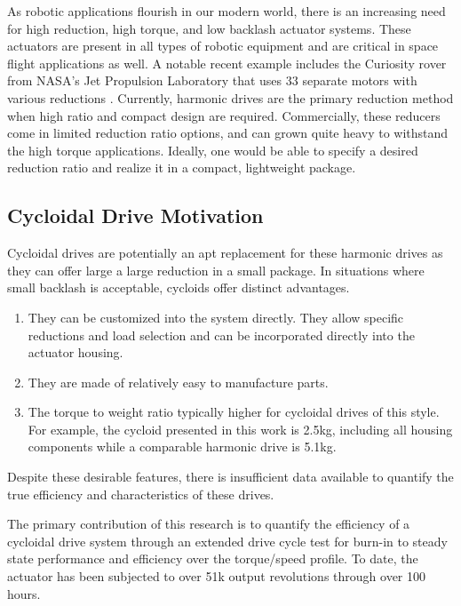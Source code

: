 As robotic applications flourish in our modern world, there is an increasing need for  high reduction, high torque, and low backlash actuator systems.
These actuators are present in all types of robotic equipment and are critical in space flight applications as well.
A notable recent example includes the Curiosity rover from NASA's Jet Propulsion Laboratory that uses 33 separate motors with various reductions \cite{curiosity}.
Currently, harmonic drives are the primary reduction method when high ratio and compact design are required.
Commercially, these reducers come in limited reduction ratio options, and can grown quite heavy to withstand the high torque applications.
Ideally, one would be able to specify a desired reduction ratio and realize it in a compact, lightweight package.

\subsection{Cycloidal Drive Motivation}

Cycloidal drives are potentially an apt replacement for these harmonic drives as they can offer large a large reduction in a small package.
In situations where small backlash is acceptable, cycloids offer distinct advantages.
\begin{enumerate}
\item
They can be customized into the system directly. They allow specific reductions and load selection and can be incorporated directly into the actuator housing.
\item
They are made of relatively easy to manufacture parts.
\item
The torque to weight ratio typically higher for cycloidal drives of this style.
For example, the cycloid presented in this work is 2.5kg, including all housing components while a comparable harmonic drive is 5.1kg.
\end{enumerate}
Despite these desirable features, there is insufficient data available to quantify the true efficiency and characteristics of these drives.

The primary contribution of this research is to quantify the efficiency of a cycloidal drive system through an extended drive cycle test for burn-in to steady state performance and efficiency over the torque/speed profile. To date, the actuator has been subjected to over 51k output revolutions through over 100 hours.

